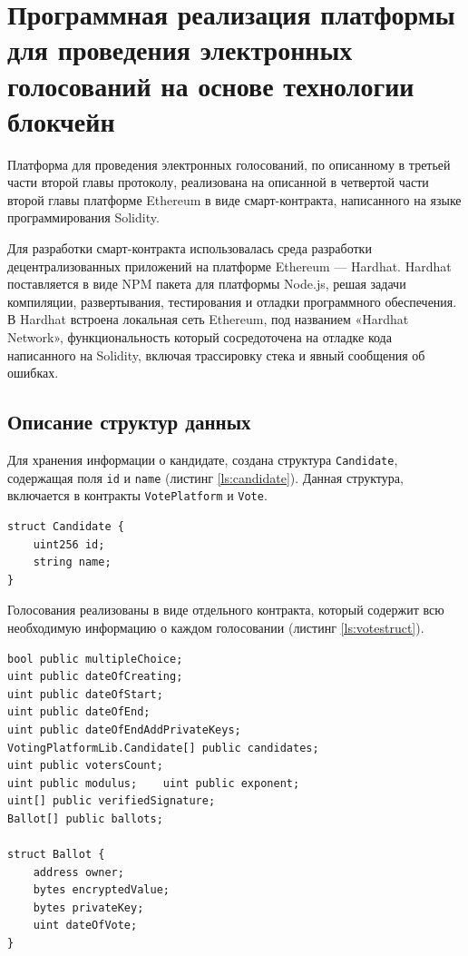 \chapter{Программная реализация платформы для проведения электронных голосований на основе технологии блокчейн}

Платформа для проведения электронных голосований, по описанному в третьей части второй главы протоколу, реализована на описанной в четвертой части второй главы платформе Ethereum в виде смарт-контракта, написанного на языке программирования Solidity.

Для разработки смарт-контракта использовалась среда разработки децентрализованных приложений на платформе Ethereum — Hardhat. Hardhat поставляется в виде NPM пакета для платформы Node.js, решая задачи компиляции, развертывания, тестирования и отладки программного обеспечения. В Hardhat встроена локальная сеть Ethereum, под названием «Hardhat Network», функциональность который сосредоточена на отладке кода написанного на Solidity, включая трассировку стека и явный сообщения об ошибках.

\section{Описание структур данных}

Для хранения информации о кандидате, создана структура \verb|Candidate|, содержащая поля \verb|id| и \verb|name| (листинг \ref{ls:candidate}). Данная структура, включается в контракты \verb|VotePlatform| и \verb|Vote|.

\begin{lstlisting}[caption={Объявление структуры Candidate}, label={ls:candidate}]
struct Candidate {
    uint256 id;
    string name;
}
\end{lstlisting}

Голосования реализованы в виде отдельного контракта, который содержит всю необходимую информацию о каждом голосовании (листинг \ref{ls:votestruct}).

\begin{lstlisting}[caption={Поля контракта Vote}, label={ls:votestruct}]
bool public multipleChoice;
uint public dateOfCreating;
uint public dateOfStart;
uint public dateOfEnd;
uint public dateOfEndAddPrivateKeys;
VotingPlatformLib.Candidate[] public candidates;
uint public votersCount;
uint public modulus;    uint public exponent;
uint[] public verifiedSignature;
Ballot[] public ballots;

struct Ballot {
    address owner;
    bytes encryptedValue;
    bytes privateKey;
    uint dateOfVote;
}
\end{lstlisting}


